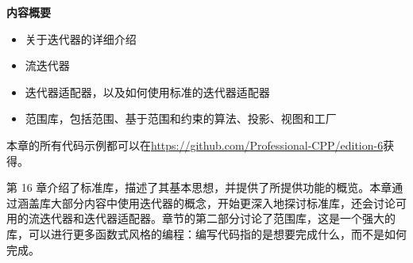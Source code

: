 \noindent
\textbf{内容概要}

\begin{itemize}
\item
关于迭代器的详细介绍

\item
流迭代器

\item
迭代器适配器，以及如何使用标准的迭代器适配器

\item
范围库，包括范围、基于范围和约束的算法、投影、视图和工厂
\end{itemize}

本章的所有代码示例都可以在\url{https://github.com/Professional-CPP/edition-6}获得。

第 16 章介绍了标准库，描述了其基本思想，并提供了所提供功能的概览。本章通过涵盖库大部分内容中使用迭代器的概念，开始更深入地探讨标准库，还会讨论可用的流迭代器和迭代器适配器。章节的第二部分讨论了范围库，这是一个强大的库，可以进行更多函数式风格的编程：编写代码指的是想要完成什么，而不是如何完成。
